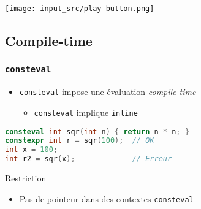 \documentclass[C++.tex]{subfiles}
\begin{document}
\begin{frame}[fragile]
	\hfill
	\href{https://godbolt.org/#g:!((g:!((g:!((h:codeEditor,i:(filename:'1',fontScale:14,fontUsePx:'0',j:1,lang:c%2B%2B,selection:(endColumn:1,endLineNumber:13,positionColumn:1,positionLineNumber:13,selectionStartColumn:1,selectionStartLineNumber:13,startColumn:1,startLineNumber:13),source:'%23include+%3Ciostream%3E%0A%23include+%3Cvector%3E%0A%0Aint+main()%0A%7B%0A++std::vector%3Cint%3E+foo%7B1,+8,+5,+56,+42%7D%3B%0A++for(size_t+i+%3D+0%3B+const+auto%26+bar+:+foo)+%0A++%7B%0A++++std::cout+%3C%3C+bar+%3C%3C+%22+%22+%3C%3C+i+%3C%3C+%22%5Cn%22%3B%0A++++%2B%2Bi%3B+%0A++%7D%0A%7D%0A'),l:'5',n:'0',o:'C%2B%2B+source+%231',t:'0')),k:50,l:'4',n:'0',o:'',s:0,t:'0'),(g:!((h:executor,i:(argsPanelShown:'1',compilationPanelShown:'0',compiler:g112,compilerOutShown:'0',execArgs:'',execStdin:'',fontScale:14,fontUsePx:'0',j:1,lang:c%2B%2B,libs:!((name:boost,ver:'175')),options:'-std%3Dc%2B%2B20',source:1,stdinPanelShown:'1',tree:'1',wrap:'0'),l:'5',n:'0',o:'Executor+x86-64+gcc+11.2+(C%2B%2B,+Editor+%231)',t:'0')),header:(),k:50,l:'4',n:'0',o:'',s:0,t:'0')),l:'2',n:'0',o:'',t:'0')),version:4}{\texttt{[image: input\_src/play-button.png]}}
\end{frame}

\subsection*{Compile-time}
\begin{frame}[fragile]
	\frametitle{\lstinline|consteval|}
	\begin{itemize}
		\item \lstinline|consteval| impose une évaluation \textit{compile-time}


		\begin{itemize}
			\item \lstinline|consteval| implique \lstinline|inline|
		\end{itemize}
	\end{itemize}

	\begin{lstlisting}[language=C++]
consteval int sqr(int n) { return n * n; }
constexpr int r = sqr(100);  // OK
int x = 100;
int r2 = sqr(x);             // Erreur\end{lstlisting}

	\begin{alertblock}{Restriction}
		\begin{itemize}
			\item Pas de pointeur dans des contextes \lstinline|consteval|
		\end{itemize}
	\end{alertblock}
\end{frame}
\end{document}
